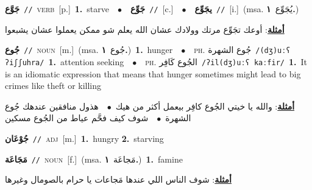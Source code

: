 \documentclass[10pt,a4paper,twoside]{article} %
\begin{document}
\begin{multicols}{2}
{\setlength\topsep{0pt}\textbf{\foreignlanguage{arabic}{جَوَّع}}\ {\color{gray}\texttt{//}\color{black}}\ \textsc{verb}\ [p.]\ \textbf{1.}~starve\ \ $\bullet$\ \ \setlength\topsep{0pt}\textbf{\foreignlanguage{arabic}{جَوِّع}}\ {\color{gray}\texttt{//}\color{black}}\ [c.]\ \ $\bullet$\ \ \setlength\topsep{0pt}\textbf{\foreignlanguage{arabic}{يجَوِّع}}\ {\color{gray}\texttt{//}\color{black}}\ [i.]\ \color{gray}(msa. \foreignlanguage{arabic}{يُجَوِّع}~\foreignlanguage{arabic}{\textbf{١.}})\color{black}\  \begin{flushright}\color{gray}\foreignlanguage{arabic}{\textbf{\underline{\foreignlanguage{arabic}{أمثلة}}}: أوعك تجَوِّع مرتك وولادك عشان الله يعلم شو ممكن يعملوا عشان يشبعوا}\end{flushright}\color{black}} \vspace{2mm}

{\setlength\topsep{0pt}\textbf{\foreignlanguage{arabic}{جُوع}}\ {\color{gray}\texttt{//}\color{black}}\ \textsc{noun}\ [m.]\ \color{gray}(msa. \foreignlanguage{arabic}{جُوع}~\foreignlanguage{arabic}{\textbf{١.}})\color{black}\ \textbf{1.}~hunger\ \ $\bullet$\ \ \textsc{ph.} \color{gray} \foreignlanguage{arabic}{جُوع الشهرة}\color{black}\ {\color{gray}\texttt{/{\sffamily (dʒ)uːʕ ʔiʃʃuhra}/}\color{black}}\ \textbf{1.}~attention seeking\ \ $\bullet$\ \ \textsc{ph.} \color{gray} \foreignlanguage{arabic}{الجُوع كَافِر}\color{black}\ {\color{gray}\texttt{/{\sffamily ʔil(dʒ)uːʕ kaːfir}/}\color{black}}\ \textbf{1.}~It is an idiomatic expression that means that hunger sometimes might lead to big crimes like theft or killing\  \begin{flushright}\color{gray}\foreignlanguage{arabic}{\textbf{\underline{\foreignlanguage{arabic}{أمثلة}}}: والله يا خيتي الجُوع كافِر بيعمل أكثر من هيك\ $\bullet$\ \  هذول منافقين عندهك جُوع الشهرة\ $\bullet$\ \  شوف كيف فحَّم عياط من الجُوع مسكين}\end{flushright}\color{black}} \vspace{2mm}

{\setlength\topsep{0pt}\textbf{\foreignlanguage{arabic}{جُوْعَان}}\ {\color{gray}\texttt{//}\color{black}}\ \textsc{adj}\ [m.]\ \textbf{1.}~hungry  \textbf{2.}~starving\ } \vspace{2mm}

{\setlength\topsep{0pt}\textbf{\foreignlanguage{arabic}{مَجَاعَة}}\ {\color{gray}\texttt{//}\color{black}}\ \textsc{noun}\ [f.]\ \color{gray}(msa. \foreignlanguage{arabic}{مَجاعَة}~\foreignlanguage{arabic}{\textbf{١.}})\color{black}\ \textbf{1.}~famine\  \begin{flushright}\color{gray}\foreignlanguage{arabic}{\textbf{\underline{\foreignlanguage{arabic}{أمثلة}}}: شوف الناس اللي عندها مَجاعات يا حرام بالصومال وغيرها}\end{flushright}\color{black}} \vspace{2mm}


\end{multicols}
\end{document}
